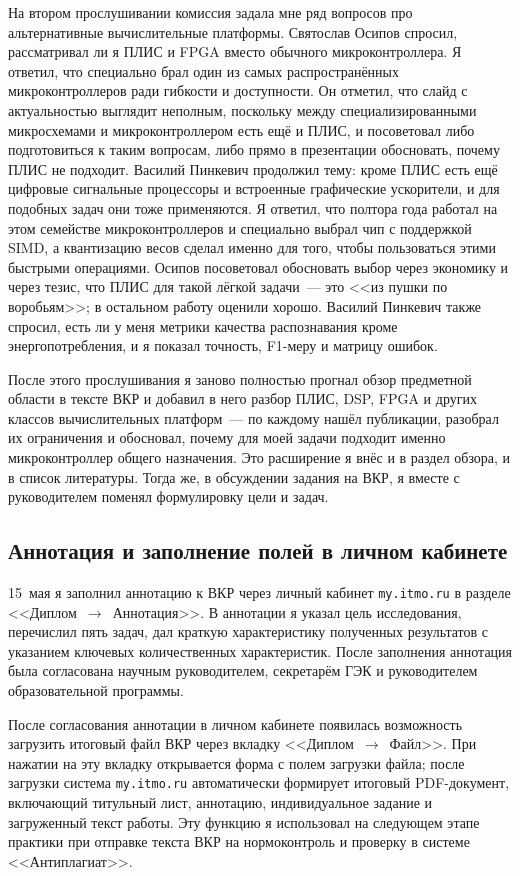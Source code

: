 На втором прослушивании комиссия задала мне ряд вопросов про
альтернативные вычислительные платформы. Святослав Осипов спросил,
рассматривал ли я ПЛИС и FPGA вместо обычного микроконтроллера. Я
ответил, что специально брал один из самых распространённых
микроконтроллеров ради гибкости и доступности. Он отметил, что слайд с
актуальностью выглядит неполным, поскольку между специализированными
микросхемами и микроконтроллером есть ещё и ПЛИС, и посоветовал либо
подготовиться к таким вопросам, либо прямо в презентации обосновать,
почему ПЛИС не подходит. Василий Пинкевич продолжил тему: кроме ПЛИС
есть ещё цифровые сигнальные процессоры и встроенные графические
ускорители, и для подобных задач они тоже применяются. Я ответил, что
полтора года работал на этом семействе микроконтроллеров и специально
выбрал чип с поддержкой SIMD, а квантизацию весов сделал именно для
того, чтобы пользоваться этими быстрыми операциями. Осипов посоветовал
обосновать выбор через экономику и через тезис, что ПЛИС для такой
лёгкой задачи~--- это <<из пушки по воробьям>>; в остальном работу
оценили хорошо. Василий Пинкевич также спросил, есть ли у меня метрики
качества распознавания кроме энергопотребления, и я показал точность,
F1-меру и матрицу ошибок.

После этого прослушивания я заново полностью прогнал обзор предметной
области в тексте ВКР и добавил в него разбор ПЛИС, DSP, FPGA и других
классов вычислительных платформ~--- по каждому нашёл публикации, разобрал
их ограничения и обосновал, почему для моей задачи подходит именно
микроконтроллер общего назначения. Это расширение я внёс и в раздел
обзора, и в список литературы. Тогда же, в обсуждении задания на ВКР, я
вместе с руководителем поменял формулировку цели и задач.

\subsection{Аннотация и заполнение полей в личном кабинете}

15~мая я заполнил аннотацию к ВКР через личный кабинет
\texttt{my.itmo.ru} в разделе <<Диплом~$\to$~Аннотация>>. В
аннотации я указал цель исследования, перечислил пять задач,
дал краткую характеристику полученных результатов с указанием
ключевых количественных характеристик. После заполнения
аннотация была согласована научным руководителем, секретарём
ГЭК и руководителем образовательной программы.

После согласования аннотации в личном кабинете появилась
возможность загрузить итоговый файл ВКР через вкладку
<<Диплом~$\to$~Файл>>. При нажатии на эту вкладку открывается
форма с полем загрузки файла; после загрузки система
\texttt{my.itmo.ru} автоматически формирует итоговый PDF-документ,
включающий титульный лист, аннотацию, индивидуальное задание
и загруженный текст работы. Эту функцию я использовал на
следующем этапе практики при отправке текста ВКР на
нормоконтроль и проверку в системе <<Антиплагиат>>.

